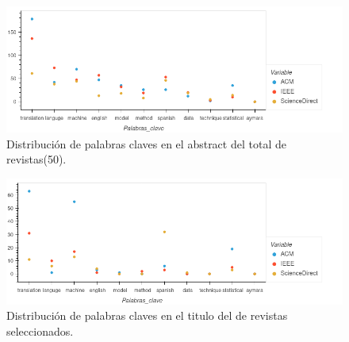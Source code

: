 \documentclass[letterpaper]{article}
\begin{document}
    \begin{figure}[hbtp]
    		\centering
    		\includegraphics[width=2.3\columnwidth]{escudos/resumen_abstract..png}
    		\caption{Distribución de palabras claves en el abstract del total de revistas(50).}
    		\label{res_abs_w1}
    \end{figure}
    \begin{figure}[hbtp]
    		\centering
    		\includegraphics[width=2.3\columnwidth]{escudos/resumen_titulo.png}
    		\caption{Distribución de palabras claves en el titulo del de revistas seleccionados.}
    		\label{res_tit_w2}
    \end{figure}
    
\end{document}
